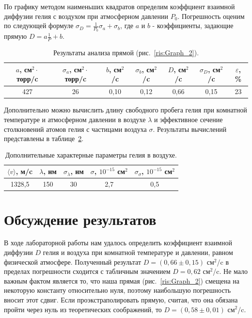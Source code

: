 \documentclass[a4paper,12pt]{article} %
\begin{document}
	 По графику методом наименьших квадратов определим коэффциент взаимной диффузии гелия с воздухом при атмосферном давлении $P_0$. Погрешность оценим по следующей формуле $\sigma_D = \frac{1}{P_0} \sigma_a + \sigma_b$, где $a$ и $b$ - коэффициенты, задающие прямую $D = a\frac{1}{P} + b$.
	\begin{table}[H]
		\caption{Результаты анализа прямой (рис.~\ref{ris:Graph_2}).}
		\label{table:results}
		\begin{tabular}{|c|c|c|c|c|c|c|}
			\hline
			$a$, см$^2 \cdot$торр/c & $\sigma_a$, см$^2 \cdot$торр/c & $b$, см$^2$/c & $\sigma_b				$, см$^2$/c & $D$, см$^2$/c & $\sigma_D$, см$^2$/c & $\varepsilon$, \% \\ \hline
			427                     & 26                             & 0,10          & 0,12                 & 0,66          & 0,15                 & 23                \\ \hline
		\end{tabular}
	\end{table}
	Дополнительно можно вычислить длину свободного пробега гелия при комнатной температуре и атмосферном давлении в воздухе $\lambda$ и эффективное сечение столкновений атомов гелия с частицами воздуха $\sigma$. Результаты вычислений представлены в таблице~\ref{table:dopolnitelno}.
	\begin{table}[H]
		\caption{Дополнительные характерные параметры гелия в воздухе.}
		\label{table:dopolnitelno}
		\begin{tabular}{|c|c|c|c|c|}
			\hline
			$\langle v \rangle$, м/c & $\lambda$, нм & $\sigma_\lambda$, нм & $\sigma$, $10^{-15}$ см$^2$ & $\sigma_\sigma$, $10^{-15}$ см$^2$ \\ \hline
			1328,5                  & 150           & 30                    & 2,7                         & 0,5                                \\ \hline
		\end{tabular}
	\end{table}
	
\section*{Обсуждение результатов}
	В ходе лабораторной работы нам удалось определить коэффициент взаимной диффузии $D$ гелия и воздуха при комнатной температуре и давлении, равном физической атмосфере. Полученный результат $D = (0,66 \pm 0,15)$ см$^2$/c в пределах погрешности сходится с табличным значением $D = 0,62$ см$^2$/c. Не мало важным фактом является то, что наша прямая (рис.~\ref{ris:Graph_2}) смещена на некоторую константу относительно нуля, поэтому наибольшую погрешность вносит этот сдвиг. Если проэкстраполировать прямую, считая, что она обязана пройти через нуль из теоретических соображений, то $D = (0,58 \pm 0,01)$ см$^2$/c.
	
\end{document}
